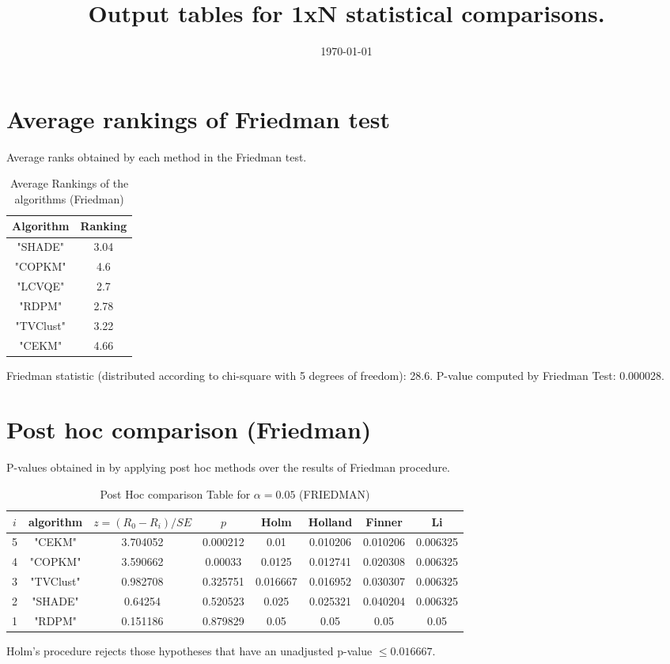 \documentclass[a4paper,10pt]{article}
\title{Output tables for 1xN statistical comparisons.}
\author{}
\date{\today}
\begin{document}
\pagestyle{empty}
\maketitle
\thispagestyle{empty}

\section{Average rankings of Friedman test}


Average ranks obtained by each method in the Friedman test.

\begin{table}[!htp]
\centering
\begin{tabular}{|c|c|}\hline
Algorithm&Ranking\\\hline
"SHADE"&3.04\\"COPKM"&4.6\\"LCVQE"&2.7\\"RDPM"&2.78\\"TVClust"&3.22\\"CEKM"&4.66\\\hline\end{tabular}
\caption{Average Rankings of the algorithms (Friedman)}
\end{table}

Friedman statistic (distributed according to chi-square with 5 degrees of freedom): 28.6. \newline P-value computed by Friedman Test: 0.000028.\newline


\newpage

\section{Post hoc comparison (Friedman)}


P-values obtained in by applying post hoc methods over the results of Friedman procedure.

\begin{table}[!htp]
\centering\footnotesize
\begin{tabular}{cccccccc}
$i$&algorithm&$z=(R_0 - R_i)/SE$&$p$&Holm &Holland&Finner&Li\\
\hline5&"CEKM"&3.704052&0.000212&0.01&0.010206&0.010206&0.006325\\4&"COPKM"&3.590662&0.00033&0.0125&0.012741&0.020308&0.006325\\3&"TVClust"&0.982708&0.325751&0.016667&0.016952&0.030307&0.006325\\2&"SHADE"&0.64254&0.520523&0.025&0.025321&0.040204&0.006325\\1&"RDPM"&0.151186&0.879829&0.05&0.05&0.05&0.05\\\hline
\end{tabular}
\caption{Post Hoc comparison Table for $\alpha=0.05$ (FRIEDMAN)}
\end{table}Holm's procedure rejects those hypotheses that have an unadjusted p-value $\le0.016667$.
\end{document}
